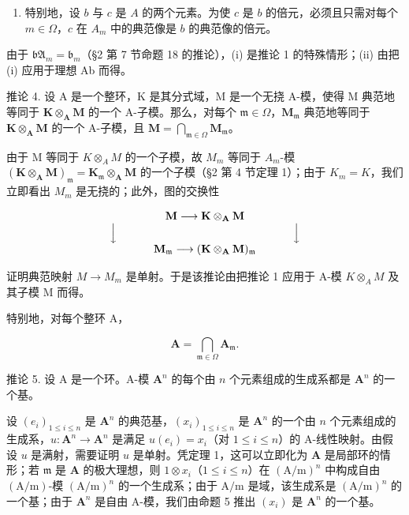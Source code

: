 \begin{enumerate}
\def\labelenumi{(\roman{enumi})}
\setcounter{enumi}{1}
\tightlist
\item
  特别地，设 \(b\) 与 \(c\) 是 \(A\) 的两个元素。为使 \(c\) 是 \(b\) 的倍元，必须且只需对每个 \(m \in \Omega\)，\(c\) 在 \(A_m\) 中的典范像是 \(b\) 的典范像的倍元。
\end{enumerate}

由于 \(\mathfrak{bA}_{m} = \mathfrak{b}_{m}\)（§2 第 7 节命题 18 的推论），(i) 是推论 1 的特殊情形；(ii) 由把 (i) 应用于理想 Ab 而得。

推论 4. 设 A 是一个整环，K 是其分式域，M 是一个无挠 A-模，使得 M 典范地等同于 \(\mathbf{K} \otimes_{\mathbf{A}} \mathbf{M}\) 的一个 A-子模。那么，对每个 \(\mathfrak{m} \in \Omega\)，\(\mathbf{M}_{\mathfrak{m}}\) 典范地等同于 \(\mathbf{K} \otimes_{\mathbf{A}} \mathbf{M}\) 的一个 A-子模，且 \(\mathbf{M} = \bigcap_{\mathfrak{m} \in \Omega} \mathbf{M}_{\mathfrak{m}}\)。

由于 M 等同于 \(K \otimes_{A} M\) 的一个子模，故 \(M_{m}\) 等同于 \(A_{m}\)-模 \((\mathbf{K} \otimes_{\mathbf{A}} \mathbf{M})_{\mathfrak{m}} = \mathbf{K}_{\mathfrak{m}} \otimes_{\mathbf{A}} \mathbf{M}\) 的一个子模（§2 第 4 节定理 1）；由于 \(K_{m} = K\)，我们立即看出 \(M_{m}\) 是无挠的；此外，图的交换性

\[
\begin{array}{c} \mathbf {M} \longrightarrow \mathbf {K} \otimes_ {\mathbf {A}} \mathbf {M} \\ \Big \downarrow \qquad \qquad \qquad \qquad \qquad \qquad \qquad \qquad \Big \downarrow \\ \mathbf {M} _ {\mathfrak {m}} \longrightarrow (\mathbf {K} \otimes_ {\mathbf {A}} \mathbf {M}) _ {\mathfrak {m}} \end{array}
\]

证明典范映射 \(M \rightarrow M_{m}\) 是单射。于是该推论由把推论 1 应用于 A-模 \(K \otimes_{A} M\) 及其子模 M 而得。

特别地，对每个整环 A，

\[
\mathbf {A} = \bigcap_ {\mathfrak {m} \in \Omega} \mathbf {A} _ {\mathfrak {m}}.\tag{2}
\]

推论 5. 设 A 是一个环。A-模 \(\mathbf{A}^n\) 的每个由 \(n\) 个元素组成的生成系都是 \(\mathbf{A}^n\) 的一个基。

设 \((e_i)_{1\leqslant i\leqslant n}\) 是 \(\mathbf{A}^n\) 的典范基，\((x_i)_{1\leqslant i\leqslant n}\) 是 \(\mathbf{A}^n\) 的一个由 \(n\) 个元素组成的生成系，\(u\colon \mathbf{A}^n\to \mathbf{A}^n\) 是满足 \(u(e_i) = x_i\)（对 \(1\leqslant i\leqslant n\)）的 A-线性映射。由假设 \(u\) 是满射，需要证明 \(u\) 是单射。凭定理 1，这可以立即化为 \(\mathbf{A}\) 是局部环的情形；若 \(\mathfrak{m}\) 是 \(\mathbf{A}\) 的极大理想，则 \(1\otimes x_i\)（\(1\leqslant i\leqslant n\)）在 \((\mathrm{A / m})^n\) 中构成自由 \((\mathrm{A / m})\)-模 \((\mathrm{A / m})^n\) 的一个生成系；由于 \(\mathrm{A / m}\) 是域，该生成系是 \((\mathrm{A / m})^n\) 的一个基；由于 \(\mathbf{A}^n\) 是自由 A-模，我们由命题 5 推出 \((x_i)\) 是 \(\mathbf{A}^n\) 的一个基。


